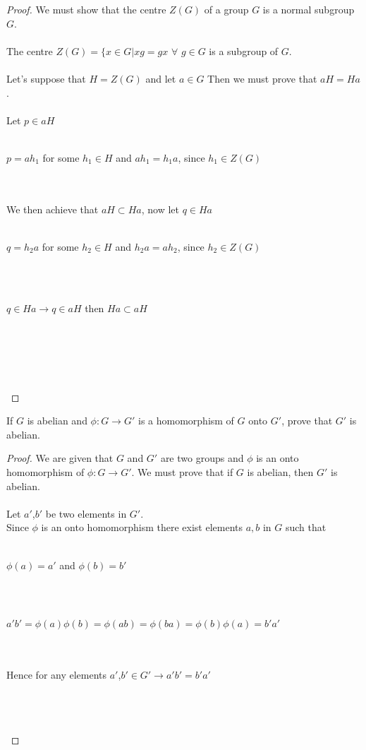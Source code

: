 \documentclass[12pt]{article}
\newenvironment{problem}[2][Problem]{\begin{trivlist}
\item[\hskip \labelsep {\bfseries #1}\hskip \labelsep {\bfseries #2.}]}{\end{trivlist}}
\begin{document}
\begin{proof}
We must show that the centre $Z(G)$ of a group $G$ is a normal subgroup $G$. \\ \\
The centre $Z(G) = \{ x \in G | xg = gx$ $\forall$ $g \in G$ is a subgroup of $G$. \\ \\
Let's suppose that $H = Z(G)$ and let $a \in G$ Then we must prove that $aH = Ha$. \\ \\
Let $p \in aH$ \\ \\
\centerline{$p = ah_1$ for some $h_1 \in H$ and $ah_1=h_1a$, since $h_1 \in Z(G)$} \\ \\
We then achieve that $aH \subset Ha$, now let $q \in Ha$ \\ \\
\centerline{$q = h_2a$ for some $h_2 \in H$ and $h_2a = ah_2$, since $h_2 \in Z(G)$} \\ \\
\centerline{$q \in Ha \rightarrow q \in aH$ then $Ha \subset aH$} \\ \\
\centerline{} \\ \\
\end{proof}

\begin{problem}{2.5.14}
If $G$ is abelian and $\phi: G \rightarrow G'$ is a homomorphism of $G$ onto $G'$, prove that $G'$ is abelian.
\end{problem}

\begin{proof}
We are given that $G$ and $G'$ are two groups and $\phi$ is an onto homomorphism of $\phi: G \rightarrow G'$. We must prove that if $G$ is abelian, then $G'$ is abelian. \\ \\
Let $a'$,$b'$ be two elements in $G'$.  \\
Since $\phi$ is an onto homomorphism there exist elements $a,b$ in $G$ such that \\ \\
\centerline{$\phi(a) = a'$ and $\phi(b) = b'$} \\ \\
\centerline{$a'b' = \phi (a) \phi (b) = \phi (ab) = \phi(ba) = \phi(b)\phi(a) = b'a'$} \\ \\
Hence for any elements $a'$,$b' \in G' \rightarrow a'b' = b'a'$ \\ \\
\centerline{} \\ \\
\end{proof}
 
\end{document}
